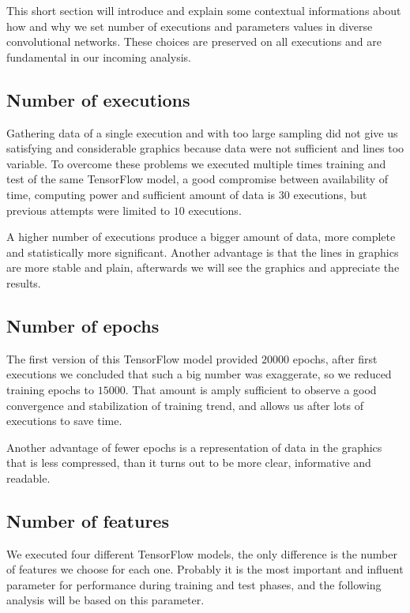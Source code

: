 This short section will introduce and explain some contextual informations about how and why we set number of executions and parameters values in diverse convolutional networks. These choices are preserved on all executions and are fundamental in our incoming analysis.

\subsection{Number of executions}

Gathering data of a single execution and with too large sampling did not give us satisfying and considerable graphics because data were not sufficient and lines too variable. To overcome these problems we executed multiple times training and test of the same TensorFlow model, a good compromise between availability of time, computing power and sufficient amount of data is $30$ executions, but previous attempts were limited to $10$ executions.

A higher number of executions produce a bigger amount of data, more complete and statistically more significant. Another advantage is that the lines in graphics are more stable and plain, afterwards we will see the graphics and appreciate the results.

\subsection{Number of epochs}

The first version of this TensorFlow model provided $20000$ epochs, after first executions we concluded that such a big number was exaggerate, so we reduced training epochs to $15000$. That amount is amply sufficient to observe a good convergence and stabilization of training trend, and allows us after lots of executions to save time.

Another advantage of fewer epochs is a representation of data in the graphics that is less compressed, than it turns out to be more clear, informative and readable.

\subsection{Number of features}

We executed four different TensorFlow models, the only difference is the number of features we choose for each one. Probably it is the most important and influent parameter for performance during training and test phases, and the following analysis will be based on this parameter.

